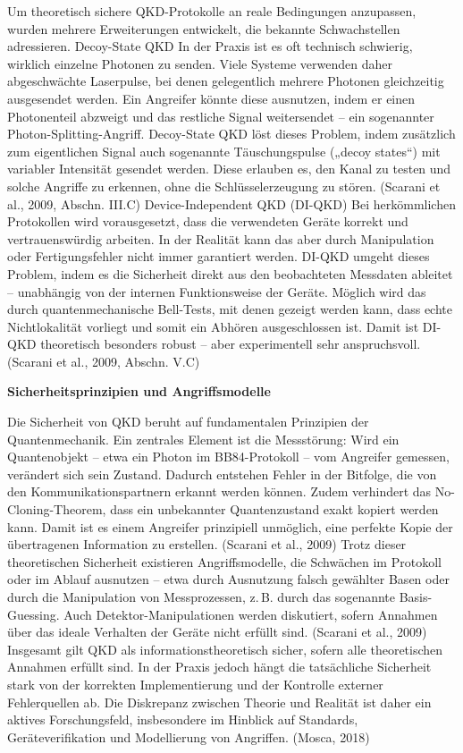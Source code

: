 \noindent
Um theoretisch sichere QKD-Protokolle an reale Bedingungen anzupassen, wurden mehrere Erweiterungen entwickelt, die bekannte Schwachstellen adressieren.
Decoy-State QKD
In der Praxis ist es oft technisch schwierig, wirklich einzelne Photonen zu senden. Viele Systeme verwenden daher abgeschwächte Laserpulse, bei denen gelegentlich mehrere Photonen gleichzeitig ausgesendet werden. Ein Angreifer könnte diese ausnutzen, indem er einen Photonenteil abzweigt und das restliche Signal weitersendet – ein sogenannter Photon-Splitting-Angriff.
Decoy-State QKD löst dieses Problem, indem zusätzlich zum eigentlichen Signal auch sogenannte Täuschungspulse („decoy states“) mit variabler Intensität gesendet werden. Diese erlauben es, den Kanal zu testen und solche Angriffe zu erkennen, ohne die Schlüsselerzeugung zu stören.
 (Scarani et al., 2009, Abschn. III.C)
Device-Independent QKD (DI-QKD)
Bei herkömmlichen Protokollen wird vorausgesetzt, dass die verwendeten Geräte korrekt und vertrauenswürdig arbeiten. In der Realität kann das aber durch Manipulation oder Fertigungsfehler nicht immer garantiert werden.
DI-QKD umgeht dieses Problem, indem es die Sicherheit direkt aus den beobachteten Messdaten ableitet – unabhängig von der internen Funktionsweise der Geräte. Möglich wird das durch quantenmechanische Bell-Tests, mit denen gezeigt werden kann, dass echte Nichtlokalität vorliegt und somit ein Abhören ausgeschlossen ist. Damit ist DI-QKD theoretisch besonders robust – aber experimentell sehr anspruchsvoll.
 (Scarani et al., 2009, Abschn. V.C)

\vspace{1em}
\noindent\textbf{Sicherheitsprinzipien und Angriffsmodelle}

\noindent
Die Sicherheit von QKD beruht auf fundamentalen Prinzipien der Quantenmechanik. Ein zentrales Element ist die Messstörung: Wird ein Quantenobjekt – etwa ein Photon im BB84-Protokoll – vom Angreifer gemessen, verändert sich sein Zustand. Dadurch entstehen Fehler in der Bitfolge, die von den Kommunikationspartnern erkannt werden können. Zudem verhindert das No-Cloning-Theorem, dass ein unbekannter Quantenzustand exakt kopiert werden kann. Damit ist es einem Angreifer prinzipiell unmöglich, eine perfekte Kopie der übertragenen Information zu erstellen.
 (Scarani et al., 2009)
Trotz dieser theoretischen Sicherheit existieren Angriffsmodelle, die Schwächen im Protokoll oder im Ablauf ausnutzen – etwa durch Ausnutzung falsch gewählter Basen oder durch die Manipulation von Messprozessen, z. B. durch das sogenannte Basis-Guessing. Auch Detektor-Manipulationen werden diskutiert, sofern Annahmen über das ideale Verhalten der Geräte nicht erfüllt sind.
 (Scarani et al., 2009)
Insgesamt gilt QKD als informationstheoretisch sicher, sofern alle theoretischen Annahmen erfüllt sind. In der Praxis jedoch hängt die tatsächliche Sicherheit stark von der korrekten Implementierung und der Kontrolle externer Fehlerquellen ab. Die Diskrepanz zwischen Theorie und Realität ist daher ein aktives Forschungsfeld, insbesondere im Hinblick auf Standards, Geräteverifikation und Modellierung von Angriffen.
 (Mosca, 2018)


